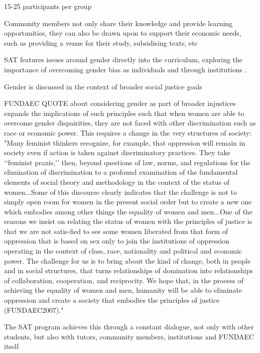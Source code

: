 15-25 participants per group \citep{Murphy-Graham2009}

Community members not only share their knowledge and provide learning opportunities, they can also be drawn upon to support their economic needs, such as providing a venue for their study, subsidising texts, etc \citep{Murphy-Graham2009}

SAT features issues around gender directly into the curriculum, exploring the importance of overcoming gender bias as individuals and through institutions \citep{Murphy-Graham2009}.

Gender is discussed in the context of broader social justice goals \citep{Murphy-Graham2009}

FUNDAEC QUOTE about considering gender as part of broader injustices expands the implications of such principles such that when women are able to overcome gender dispairities, they are not faced with other discrimination such as race or economic power. This requires a change in the very structures of society: "Many feminist thinkers recognize, for example, that oppression will remain in society even if action is taken against discriminatory practices. They take ‘‘feminist praxis,’’ then, beyond questions of law, norms, and regulations for the elimination of discrimination to a profound examination of the fundamental elements of social theory and methodology in the context of the status of women...Some of this discourse clearly indicates that the challenge is not to simply open room for women in the present social order but to create a new one which embodies among other things the equality of women and men...One of the reasons we insist on relating the status of women with the principles of justice is that we are not satis-fied to see some women liberated from that form of oppression that is based on sex only to join the institutions of oppression operating in the context of class, race, nationality and political and economic power. The challenge for us is to bring about the kind of change, both in people and in social structures, that turns relationships of domination into relationships of collaboration, cooperation, and reciprocity. We hope that, in the process of achieving the equality of women and men, humanity will be able to eliminate oppression and create a society that embodies the principles of justice (FUNDAEC2007)."  \citep{Murphy-Graham2009}


The SAT program achieves this through a constant dialogue, not only with other students, but also with tutors, community members, institutions and FUNDAEC itself \citep{Murphy-Graham2009}

